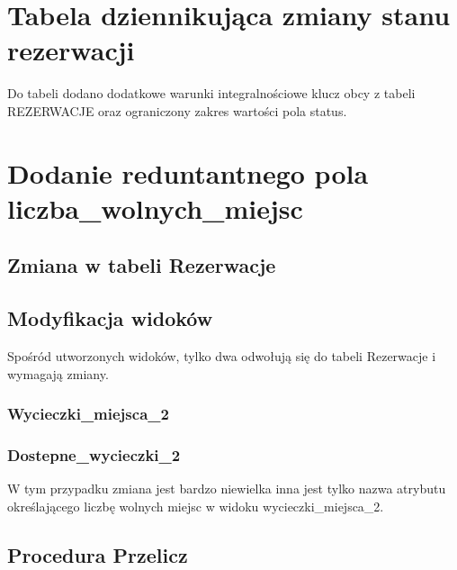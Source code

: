 \documentclass[12pt, a4paper]{mwrep}
\begin{document}


\chapter{Tabela dziennikująca zmiany stanu rezerwacji}



Do tabeli dodano dodatkowe warunki integralnościowe \ppauza klucz obcy z tabeli REZERWACJE oraz ograniczony zakres wartości pola status.

\chapter{Dodanie reduntantnego pola liczba\_wolnych\_miejsc}

\section{Zmiana w tabeli Rezerwacje}



\section{Modyfikacja widoków}

Spośród utworzonych widoków, tylko dwa odwołują się do tabeli Rezerwacje i wymagają zmiany.

\subsection{Wycieczki\_miejsca\_2}



\subsection{Dostepne\_wycieczki\_2}



W tym przypadku zmiana jest bardzo niewielka \ppauza inna jest tylko nazwa atrybutu określającego liczbę wolnych miejsc w widoku wycieczki\_miejsca\_2.

\newpage
\section{Procedura Przelicz}
\end{document}
